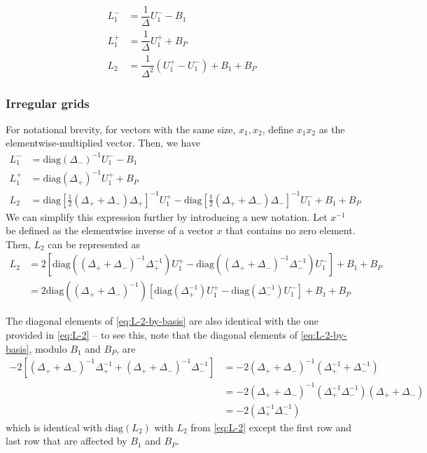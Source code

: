 \documentclass[11pt]{article}
\begin{document}
\begin{align}
L_1^{-} &= \dfrac{1}{\Delta} U_1^{-} - B_1 \\
L_1^{+} &= \dfrac{1}{\Delta} U_1^{+} + B_P \\
L_2 &= \dfrac{1}{\Delta^2} (U_1^+ - U_1^-) + B_1 + B_P
\end{align}

\subsubsection{Irregular grids}
For notational brevity, for vectors with the same size, $x_1, x_2$, define $x_1 x_2$ as the elementwise-multiplied vector. Then, we have
\begin{align}
L_1^{-} &= \text{diag}(\Delta_{-} )^{-1} U_1^{-} - B_1 \\
L_1^{+} &= \text{diag}(\Delta_{+} )^{-1} U_1^{+} + B_P \\
L_2 &= \text{diag} \left[ \frac{1}{2} ( \Delta_+ + \Delta_- ) \Delta_+ \right]^{-1}  U_1^{+} - 
 \text{diag} \left[ \frac{1}{2} ( \Delta_+ + \Delta_- ) \Delta_- \right]^{-1}  U_1^{-} 
+ B_1 + B_P 
\end{align}
We can simplify this expression further by introducing a new notation. Let $x^{-1}$ be defined as the elementwise inverse of a vector $x$ that contains no zero element. Then, $L_2$ can be represented as
\begin{align}
L_2 &=
2\left[ \text{diag} \left( ( \Delta_+ + \Delta_- )^{-1} \Delta_+^{-1} \right) U_1^{+} - 
\text{diag} \left( ( \Delta_+ + \Delta_- )^{-1} \Delta_-^{-1} \right) U_1^{-}  \right]
+ B_1 + B_P \\ \label{eq:L-2-by-basis}
&= 2 \text{diag} \left( ( \Delta_+ + \Delta_- )^{-1} \right) \left[ \text{diag} \left(  \Delta_+^{-1} \right) U_1^{+} - 
\text{diag} \left(  \Delta_-^{-1} \right) U_1^{-}  \right]
+ B_1 + B_P
\end{align}


The diagonal elements of \eqref{eq:L-2-by-basis} are also identical with the one provided in \eqref{eq:L-2} -- to see this, note that the diagonal elements of \eqref{eq:L-2-by-basis}, modulo $B_1$ and $B_P$, are
\begin{align}
-2 \left[ (\Delta_+ + \Delta_-)^{-1} \Delta_+^{-1} + (\Delta_+ + \Delta_-)^{-1} \Delta_-^{-1} \right] &= -2 (\Delta_+ + \Delta_-)^{-1}  ( \Delta_+^{-1} + \Delta_-^{-1} ) \\
&= -2(\Delta_+ + \Delta_-)^{-1} (\Delta_+^{-1} \Delta_-^{-1}) (\Delta_+ + \Delta_- )  \\
&= -2 (\Delta_+^{-1} \Delta_-^{-1})
\end{align}
which is identical with $\text{diag} (L_2)$ with $L_2$ from \eqref{eq:L-2} except the first row and last row that are affected by $B_1$ and $B_P$.



\end{document}
